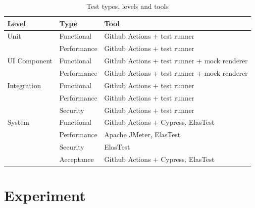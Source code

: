 \documentclass[conference]{IEEEtran}
\begin{document}
\begin{table}[t]
	\centering
	\begin{tabular}{| l | l | l |}
		\toprule
		\textbf{Level} & \textbf{Type} & \textbf{Tool}                                \\
		\midrule
		Unit           & Functional    & Github Actions + test runner                 \\
		               & Performance   & Github Actions + test runner                 \\
		\midrule
		UI Component   & Functional    & Github Actions + test runner + mock renderer \\
		               & Performance   & Github Actions + test runner + mock renderer \\
		\midrule
		Integration    & Functional    & Github Actions + test runner                 \\
		               & Performance   & Github Actions + test runner                 \\
		               & Security      & Github Actions + test runner                 \\
		\midrule
		System         & Functional    & Github Actions + Cypress, ElasTest           \\
		               & Performance   & Apache JMeter, ElasTest                      \\
		               & Security      & ElasTest                                     \\
		               & Acceptance    & Github Actions + Cypress, ElasTest           \\
		\midrule
	\end{tabular}
	\caption{Test types, levels and tools}
	\label{tab:test-levels-and-tools}
\end{table}

\section{Experiment}
\end{document}

